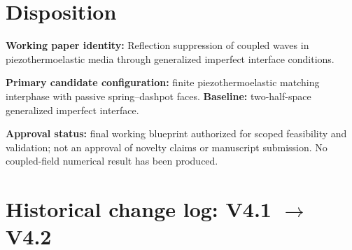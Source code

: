 \documentclass[11pt]{article}
\begin{document}
\section{Disposition}

\textbf{Working paper identity:} Reflection suppression of coupled waves in
piezothermoelastic media through generalized imperfect interface conditions.

\textbf{Primary candidate configuration:} finite piezothermoelastic matching
interphase with passive spring--dashpot faces. \textbf{Baseline:} two-half-space
generalized imperfect interface.

\textbf{Approval status:} final working blueprint authorized for scoped
feasibility and validation; not an approval of novelty claims or manuscript
submission. No coupled-field numerical result has been produced.

\appendix
\section{Historical change log: V4.1 $\to$ V4.2}
\end{document}
